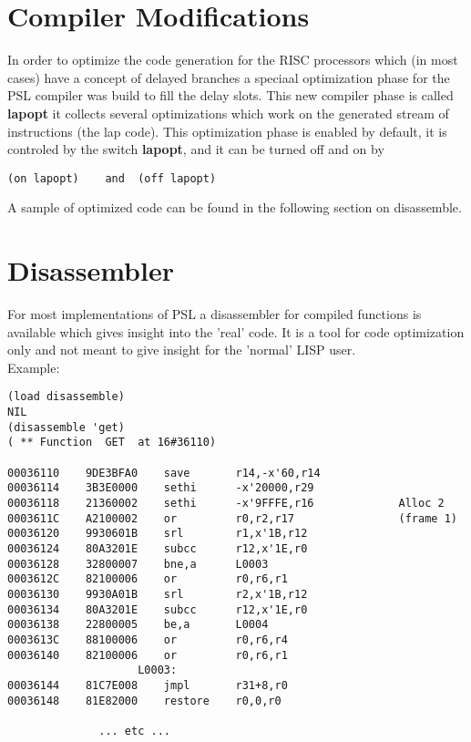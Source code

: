 \section{Compiler Modifications}

In order to optimize the code generation for the RISC processors which
(in most cases) have a concept of delayed branches a speciaal optimization
phase for the PSL compiler was build to fill the delay slots. This 
new compiler phase is called {\bf lapopt} it collects several optimizations
which work on the generated stream of instructions 
(the lap code). This  optimization phase is enabled by default,
it is controled by the switch {\bf lapopt}, and it can be turned off and on by
\begin{verbatim}
(on lapopt)    and  (off lapopt)
\end{verbatim}

A sample of optimized code can be found in the following section
on disassemble.

\section{Disassembler}

For most implementations of PSL a disassembler for compiled functions
is available which gives insight into the 'real' code. It is a tool
for code optimization only and not meant to give insight for the
'normal' LISP user.  \\
Example:
\begin{verbatim}
(load disassemble)
NIL
(disassemble 'get)
( ** Function  GET  at 16#36110)

00036110    9DE3BFA0    save       r14,-x'60,r14
00036114    3B3E0000    sethi      -x'20000,r29
00036118    21360002    sethi      -x'9FFFE,r16             Alloc 2
0003611C    A2100002    or         r0,r2,r17                (frame 1)
00036120    9930601B    srl        r1,x'1B,r12
00036124    80A3201E    subcc      r12,x'1E,r0
00036128    32800007    bne,a      L0003
0003612C    82100006    or         r0,r6,r1
00036130    9930A01B    srl        r2,x'1B,r12
00036134    80A3201E    subcc      r12,x'1E,r0
00036138    22800005    be,a       L0004
0003613C    88100006    or         r0,r6,r4
00036140    82100006    or         r0,r6,r1
                    L0003:
00036144    81C7E008    jmpl       r31+8,r0
00036148    81E82000    restore    r0,0,r0

              ... etc ...
\end{verbatim}

